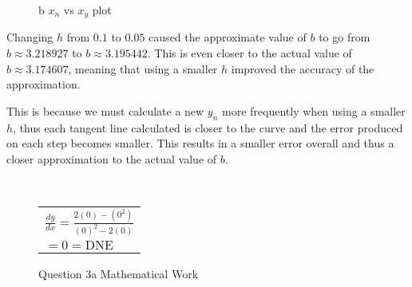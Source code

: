 \documentclass[answers,addpoints]{exam}
\begin{document}
\begin{questions}
\begin{solution}
    \begin{figure}[H]
      \centering
      \caption{b $x_n$ vs $x_y$ plot}
      \label{fig:2b-plot}
    \end{figure}

    Changing $h$ from $0.1$ to $0.05$ caused the approximate value of $b$ to go from $b \approx 3.218927$ to $b \approx 3.195442$. This is even closer to the actual value of $b \approx 3.174607$, meaning that using a smaller $h$ improved the accuracy of the approximation.

    This is because we must calculate a new $y_n$ more frequently when using a smaller $h$, thus each tangent line calculated is closer to the curve and the error produced on each step becomes smaller. This results in a smaller error overall and thus a closer approximation to the actual value of $b$.

  \end{solution}

  \question \
  \begin{solution}

    \begin{figure}[H]
      \centering
      \begin{tabular}{@{}l@{}}
        $\displaystyle \frac{dy}{dx}=\frac{2(0)-(0^2)}{(0)^2-2(0)}$ \\[6pt]
        $\displaystyle =0=\text{DNE}$ \\[6pt]
      \end{tabular}
      \caption{Question 3a Mathematical Work}
      \label{fig:3a-math}
    \end{figure}


\end{solution}
\end{questions}
\end{document}
